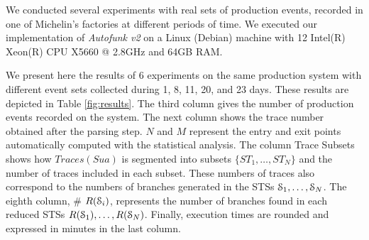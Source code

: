 We conducted several experiments with real sets of production
events, recorded in one of Michelin's factories at different
periods of time. We executed our implementation of \emph{Autofunk
v2} on a Linux (Debian) machine with 12 Intel(R) Xeon(R) CPU
X5660 @ 2.8GHz and 64GB RAM.

We present here the results of 6 experiments on the same
production system with different event sets collected during 1,
8, 11, 20, and 23 days. These results are depicted in Table
\ref{fig:results}. The third column gives the number of
production events recorded on the system. The next column shows
the trace number obtained after the parsing step.  $N$ and $M$
represent the entry and exit points automatically computed with
the statistical analysis. The column Trace Subsets shows how
$Traces(Sua)$ is segmented into subsets $\{ST_1,\dots,ST_N\}$ and
the number of traces included in each subset. These numbers of
traces also correspond to the numbers of branches generated in
the STSs $\EuScript{S}_1,\dots,\EuScript{S}_N$. The eighth column,
\# $R(\EuScript{S}_i)$, represents the number of branches found
in each reduced STSs $R(\EuScript{S}_1),\dots,R(\EuScript{S}_N)$.
Finally, execution times are rounded and expressed in minutes in
the last column.

